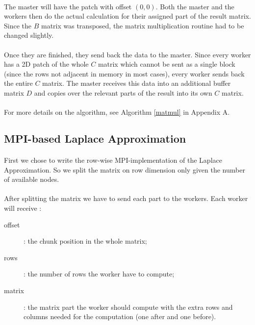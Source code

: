\documentclass[]{article}
\begin{document}
\paragraph{} The master will have the patch with offset $(0, 0)$. Both the master and the workers then do the actual calculation for their assigned part of the result matrix. Since the $B$ matrix was transposed, the matrix multiplication routine had to be changed slightly.

\paragraph{} Once they are finished, they send back the data to the master. Since every worker has a 2D patch of the whole $C$ matrix which cannot be sent as a single block (since the rows not adjacent in memory in most cases), every worker sends back the entire $C$ matrix. The master receives this data into an additional buffer matrix $D$ and copies over the relevant parts of the result into its own $C$ matrix.

\paragraph{} For more details on the algorithm, see Algorithm \ref{matmul} in Appendix A.

\subsection{MPI-based Laplace Approximation}

\paragraph{} First we chose to write the row-wise MPI-implementation of the Laplace Approximation. So we split the matrix on row dimension only given the number of available nodes.
\paragraph{} After splitting the matrix we have to send each part to the workers. Each worker will receive : 
\begin{description}
	\item[offset]: the chunk position in the whole matrix; 
	\item[rows]: the number of rows the worker have to compute;
	\item[matrix]: the matrix part the worker should compute with the extra rows and columns needed for the computation (one after and one before). 
\end{description}
\end{document}
